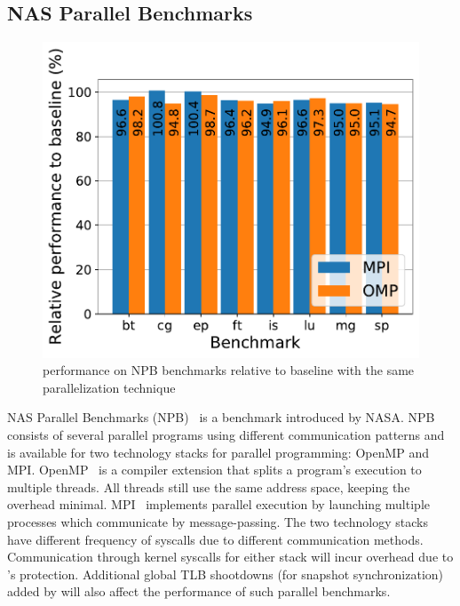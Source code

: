\documentclass[letterpaper,twocolumn,10pt, anonymous]{article}
\begin{document}
\subsection{NAS Parallel Benchmarks}

\begin{figure}[]
  \includegraphics[width=\linewidth]{img/npb_performance.pdf}
  \caption{\tiktok performance on NPB benchmarks relative to baseline with 
          the same parallelization technique}
  \label{fig:npb_performance}
\end{figure}

NAS Parallel Benchmarks (NPB)~\cite{npb} is a benchmark introduced by
NASA. 
NPB consists of several parallel programs using different communication
patterns and is available for two technology stacks for parallel programming:
OpenMP and MPI.
OpenMP~\cite{dagum1998openmp} is a compiler extension that splits a 
program's execution to multiple threads. 
All threads still use the same address space, keeping the overhead minimal. 
MPI~\cite{snir1998mpi} implements parallel execution by launching multiple
processes which communicate by message-passing. 
The two technology stacks have different frequency of syscalls due to 
different communication methods.
Communication through kernel syscalls for either stack will incur overhead
due to \tiktok's protection.
Additional global TLB shootdowns (for snapshot synchronization) added by \tiktok will also affect the 
performance of such parallel benchmarks.
\end{document}
